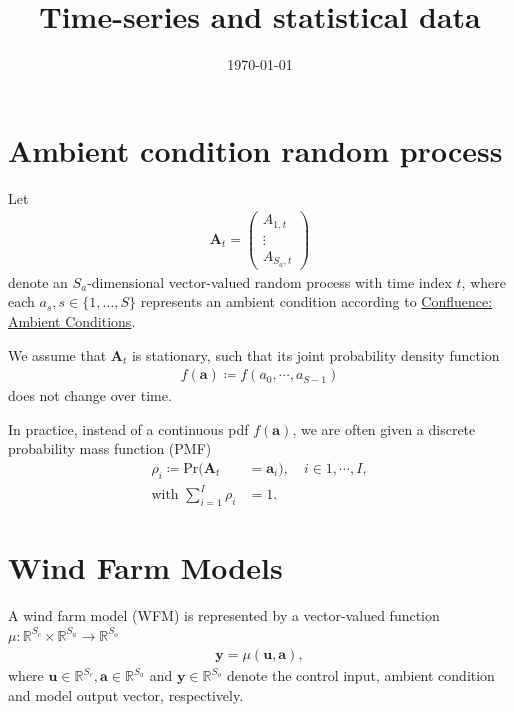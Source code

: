 \documentclass{article}
\title{Time-series and statistical data}
\date{\today} %
\begin{document}
    \maketitle
    \tableofcontents
    \section{Ambient condition random process}
    Let
    \begin{align}
        \boldsymbol{A}_t = \left(\begin{array}{c}
            A_{1, t}\\
            \vdots\\
            A_{S_a, t}
        \end{array}\right)
    \end{align}
    denote an $S_a$-dimensional vector-valued random process with time index $t$, where each $a_s, s \in \{1, \dots, S\}$ represents an ambient condition according to \href{https://confluence.tudelft.nl/spaces/FTC/pages/209716272/Software+Implementation#Software\%2FImplementation-Ambientconditions}{Confluence: Ambient Conditions}.

    We assume that $\boldsymbol{A}_t$ is stationary, such that its joint probability density function
    \begin{align}
        f(\boldsymbol{a}) \coloneqq f(a_0, \cdots, a_{S - 1})
    \end{align} 
    does not change over time.

    In practice, instead of a continuous pdf $f(\boldsymbol{a})$, we are often given a discrete probability mass function (PMF)
    \begin{align}
        \rho_i \coloneqq \text{Pr}(\boldsymbol{A}_t &= \boldsymbol{a}_i), \quad i \in 1, \cdots, I,\\
        \text{with }\sum_{i = 1}^I \rho_i &= 1.
    \end{align}
    

    \section{Wind Farm Models}
    A wind farm model (WFM) is represented by a vector-valued function $\mu: \mathbb{R}^{S_c} \times \mathbb{R}^{S_a} \rightarrow \mathbb{R}^{S_o}$
    \begin{align}
        \boldsymbol{y} = \mu(\boldsymbol{u}, \boldsymbol{a}),
    \end{align}
    where $\boldsymbol{u} \in \mathbb{R}^{S_c}, \boldsymbol{a} \in \mathbb{R}^{S_a}$ and $\boldsymbol{y} \in \mathbb{R}^{S_o}$
    denote the control input, ambient condition and model output vector, respectively.
\end{document}
